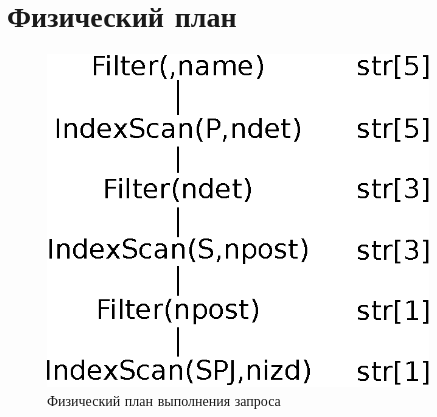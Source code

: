 \documentclass[russian,utf8,emptystyle]{eskdtext}
\begin{document}
\section{Физический план}
\begin{figure}[h!]
\centering
\includegraphics[width=0.9\textwidth]{phys_plan}
\caption{Физический план выполнения запроса}
\label{fig:phys_plan}
\end{figure}
\end{document}
